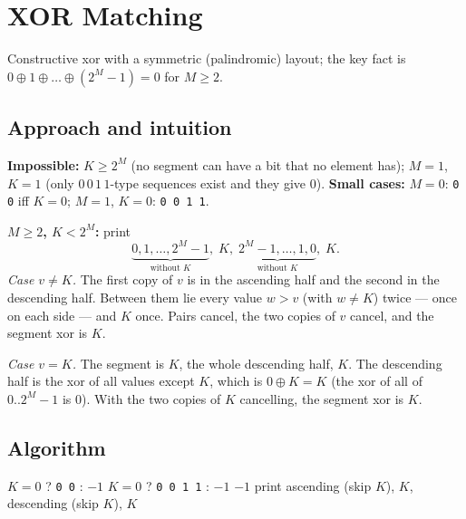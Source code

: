 \section{XOR Matching}
\label{sec:b-xor-matching}


\begin{patternbox}
Constructive xor with a symmetric (palindromic) layout; the key fact is
$0\oplus1\oplus\dots\oplus(2^M-1)=0$ for $M\ge2$.
\end{patternbox}

\subsection*{Approach and intuition}

\textbf{Impossible:} $K\ge2^M$ (no segment can have a bit that no element has);
$M=1$, $K=1$ (only $0\,0\,1\,1$-type sequences exist and they give $0$).
\textbf{Small cases:} $M=0$: \texttt{0 0} iff $K=0$; $M=1$, $K=0$:
\texttt{0 0 1 1}.

\textbf{$M\ge2$, $K<2^M$:} print
\[
  \underbrace{0,1,\dots,2^M-1}_{\text{without }K},\;K,\;\underbrace{2^M-1,\dots,1,0}_{\text{without }K},\;K .
\]
\emph{Case $v\ne K$.} The first copy of $v$ is in the ascending half and
the second in the descending half. Between them lie every value $w>v$ (with
$w\ne K$) twice --- once on each side --- and $K$ once. Pairs cancel, the
two copies of $v$ cancel, and the segment xor is $K$.

\emph{Case $v=K$.} The segment is $K$, the whole descending half, $K$. The
descending half is the xor of all values except $K$, which is
$0\oplus K=K$ (the xor of all of $0..2^M-1$ is $0$). With the two copies of
$K$ cancelling, the segment xor is $K$.

\subsection*{Algorithm}
\begin{algorithmic}[1]
 \Return $K=0$ ? \texttt{0 0} : $-1$ \EndIf
{} \Return $K=0$ ? \texttt{0 0 1 1} : $-1$ \EndIf
{} \Return $-1$ \EndIf
\State print ascending (skip $K$), $K$, descending (skip $K$), $K$
\end{algorithmic}

